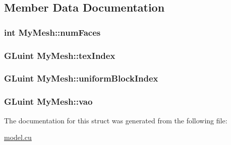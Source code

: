 \subsection{Member Data Documentation}
\hypertarget{structMyMesh_a39b1f0dd832a9e67517cd0f11183a45f}{
\subsubsection[{num\-Faces}]{\setlength{\rightskip}{0pt plus 5cm}int My\-Mesh\-::num\-Faces}}\label{structMyMesh_a39b1f0dd832a9e67517cd0f11183a45f}
\hypertarget{structMyMesh_a793a930c901855b9f8bdbeb065070a80}{
\subsubsection[{tex\-Index}]{\setlength{\rightskip}{0pt plus 5cm}G\-Luint My\-Mesh\-::tex\-Index}}\label{structMyMesh_a793a930c901855b9f8bdbeb065070a80}
\hypertarget{structMyMesh_a6428d32d0468cf606522c4f4f838d26d}{
\subsubsection[{uniform\-Block\-Index}]{\setlength{\rightskip}{0pt plus 5cm}G\-Luint My\-Mesh\-::uniform\-Block\-Index}}\label{structMyMesh_a6428d32d0468cf606522c4f4f838d26d}
\hypertarget{structMyMesh_a2e84e6ea2bf5ce3aa936e456577e7721}{
\subsubsection[{vao}]{\setlength{\rightskip}{0pt plus 5cm}G\-Luint My\-Mesh\-::vao}}\label{structMyMesh_a2e84e6ea2bf5ce3aa936e456577e7721}


The documentation for this struct was generated from the following file\-:\begin{DoxyCompactItemize}
\item 
\hyperlink{model_8cu}{model.\-cu}\end{DoxyCompactItemize}
